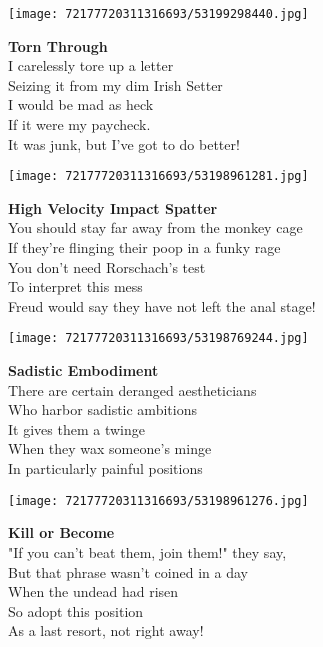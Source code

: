 \documentclass[10pt,letterpaper]{article}
\begin{document}
\begin{center}\texttt{[image: 72177720311316693/53199298440.jpg]}
\end{center}
\begin{center}
\textbf{Torn Through}\\
\vskip 0.2in
I carelessly tore up a letter\\
Seizing it from my dim Irish Setter\\
I would be mad as heck\\
If it were my paycheck.\\
It was junk, but I've got to do better!\\
\end{center}
\pagebreak

\begin{center}
\texttt{[image: 72177720311316693/53198961281.jpg]}
\end{center}

\begin{center}
\textbf{High Velocity Impact Spatter}\\
\vskip 0.2in
You should stay far away from the monkey cage\\
If they're flinging their poop in a funky rage\\
You don't need Rorschach's test\\
To interpret this mess\\
Freud would say they have not left the anal stage!\\
\end{center}
\pagebreak

\begin{center}\texttt{[image: 72177720311316693/53198769244.jpg]}
\end{center}
\begin{center}
\textbf{Sadistic Embodiment}\\
\vskip 0.2in
There are certain deranged aestheticians\\
Who harbor sadistic ambitions\\
It gives them a twinge\\
When they wax someone's minge\\
In particularly painful positions\\
\end{center}
\pagebreak

\begin{center}\texttt{[image: 72177720311316693/53198961276.jpg]}
\end{center}
\begin{center}
\textbf{Kill or Become}\\
\vskip 0.2in
"If you can't beat them, join them!" they say,\\
But that phrase wasn't coined in a day\\
When the undead had risen\\
So adopt this position\\
As a last resort, not right away!\\
\end{center}
\pagebreak
\end{document}
